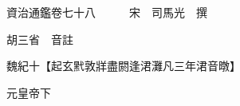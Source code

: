 










 


 
 


 

  
  
  
  
  





  
  
  
  
  
 
  

  

  
  
  



  

 
 

  
   




  

  
  


  　　資治通鑑卷七十八　　　宋　司馬光　撰

　　胡三省　音註

　　魏紀十【起玄黓敦牂盡閼逢涒灘凡三年涒音暾】

　　元皇帝下

